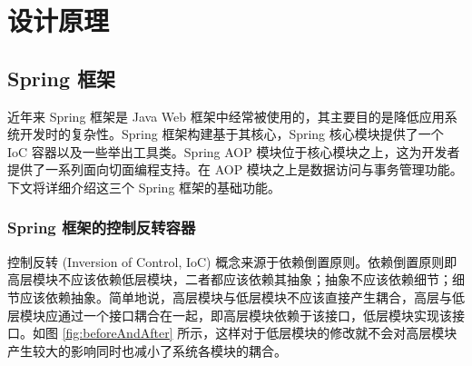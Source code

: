 \chapter{设计原理}\label{sec:theory}

\section{Spring 框架}

近年来 Spring 框架是 Java Web 框架中经常被使用的，其主要目的是降低应用系统开发时的复杂性。Spring 框架构建基于其核心，Spring 核心模块提供了一个 IoC 容器以及一些举出工具类。Spring AOP 模块位于核心模块之上，这为开发者提供了一系列面向切面编程支持。在 AOP 模块之上是数据访问与事务管理功能\cite{walls2005spring}。下文将详细介绍这三个 Spring 框架的基础功能。

\subsection{Spring 框架的控制反转容器}

控制反转 (Inversion of Control, IoC) 概念来源于依赖倒置原则。依赖倒置原则即高层模块不应该依赖低层模块，二者都应该依赖其抽象；抽象不应该依赖细节；细节应该依赖抽象\cite{gamma1995design}。简单地说，高层模块与低层模块不应该直接产生耦合，高层与低层模块应通过一个接口耦合在一起，即高层模块依赖于该接口，低层模块实现该接口。如图 \ref{fig:beforeAndAfter} 所示，这样对于低层模块的修改就不会对高层模块产生较大的影响同时也减小了系统各模块的耦合。

